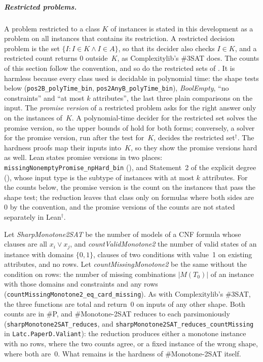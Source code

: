 \documentclass[pdflatex,sn-mathphys-num]{sn-jnl}
\theoremstyle{thmstyleone}
\theoremstyle{thmstylethree}
\newcommand{\informal}{\ensuremath{^{\dagger}}}
\begin{document}
\subparagraph*{Restricted problems.}
A problem restricted to a class $K$ of instances is stated in this development as a problem on
all instances that contains its restriction. A restricted decision problem is the set
$\{I : I \in K \land I \in A\}$, so that its decider also checks $I \in K$, and a restricted
count returns $0$ outside~$K$, as Complexitylib's \#3SAT does. The counts of this section follow
the convention, and so do the restricted sets of . It is
harmless because every class used is decidable in polynomial time: the shape tests below
(\lstinline{pos2B_polyTime_bin}, \lstinline{pos2AnyB_polyTime_bin}), \textit{BoolEmpty}, ``no
constraints'' and ``at most $k$ attributes'', the last three plain comparisons on the input. The
\emph{promise version} of a restricted problem asks for the right answer only on the instances
of~$K$. A polynomial-time decider for the restricted set solves the promise version, so the
upper bounds of  hold for both forms; conversely, a solver for the promise
version, run after the test for~$K$, decides the restricted set\informal. The hardness proofs
map their inputs into~$K$, so they show the promise versions hard as well. Lean states promise
versions in two places: \lstinline{missingNonemptyPromise_npHard_bin} (),
and Statement~2 of the explicit degree (), whose input type is the subtype of
instances with at most $k$ attributes. For the counts below, the promise version is the count
on the instances that pass the shape test; the reduction leaves that class only on formulas
where both sides are~$0$ by the convention, and the promise versions of the counts are not
stated separately in Lean\informal.

Let \textit{SharpMonotone2SAT} be the number of models of a CNF formula whose clauses are all
$x_i \lor x_j$, and \textit{countValidMonotone2} the number of valid states of an instance with
domains $\{0,1\}$, clauses of two conditions with value~1 on existing attributes, and no rows. Let
\textit{countMissingMonotone2} be the same without the condition on rows: the number of missing
combinations $|M(T_0)|$ of an instance with those domains and constraints and any rows
(\lstinline{countMissingMonotone2_eq_card_missing}). As with Complexitylib's \#3SAT, the three
functions are total and return~$0$ on inputs of any other shape. Both counts are in \#P, and
\#Monotone-2SAT reduces to each parsimoniously (\lstinline{sharpMonotone2SAT_reduces}, and
\lstinline{sharpMonotone2SAT_reduces_countMissing} in \lstinline{Latc.PaperD.Valiant}): the
reduction produces either a monotone instance with no rows, where the two counts agree, or a
fixed instance of the wrong shape, where both are~$0$. What remains is the hardness of
\#Monotone-2SAT itself.
\end{document}
